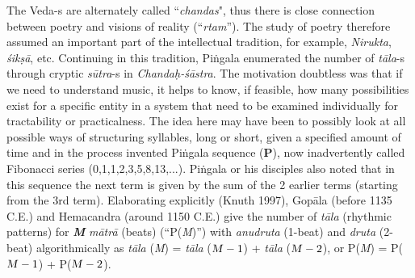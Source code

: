 The Veda-s are alternately called “\textsl{chandas}", thus there is close connection between poetry and visions of reality (“\textsl{rtam}”). The study of poetry therefore assumed an important part of the intellectual tradition, for example, \textsl{Nirukta}, \textsl{śikṣā}, etc. Continuing in this tradition, Piṅgala enumerated the number of \textsl{tāla}-s through cryptic \textsl{sūtra}-s in \textsl{Chandaḥ-śāstra}. The motivation doubtless was that if we need to understand music, it helps to know, if feasible, how many possibilities exist for a specific entity in a system that need to be examined individually for tractability or practicalness. The idea here may have been to possibly look at all possible ways of structuring syllables, long or short, given a specified amount of time and in the process invented Piṅgala sequence (\textbf{P}), now inadvertently called Fibonacci series (0,1,1,2,3,5,8,13,...). Piṅgala
 or his disciples also noted that in this sequence the next term is given by the sum of the 2 earlier terms (starting from the 3rd term). Elaborating explicitly (Knuth 1997), Gopāla (before 1135 C.E.) and Hemacandra (around 1150 C.E.) give the number of \textsl{tāla} (rhythmic patterns) for \textsl{\textbf{M}} \textsl{mātrā} (beats) (“P(\textsl{M})”) with \textsl{anudruta} (1-beat) and \textsl{druta} (2-beat) algorithmically as \textsl{tāla} (\textsl{M}) = \textsl{tāla} ($\text{\textsl{M}}-1$) + \textsl{tāla} ($\text{\textsl{M}}-2$), or P(\textsl{M}) = P($\text{\textsl{M}}-1$) + P($\text{\textsl{M}}-2$).

